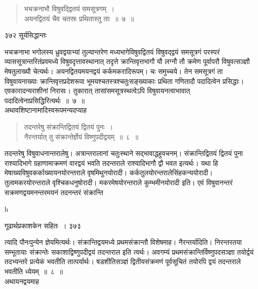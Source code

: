 \documentclass[11pt, openany]{book}
\begin{document}
 \begin{quote}
{\ssi भचक्रनाभौ विषुवद्द्वितयं समसूत्रगम्~।\\
अयनद्वितयं चैव चतस्रः प्रथितास्तु ताः~॥~७~॥}
\end{quote}


\newpage


\noindent ३७२ \hspace{4cm} सूर्यसिद्धान्तः
\vspace{1cm}


 भचक्रनाभा भगोलस्य ध्रुवद्वयाभ्यां तुल्यान्तरेण मध्यभागेविषुवद्वितयं विषुवद्द्वयं समसूत्रगं परस्परं व्याससूत्रान्तरितंप्रवमध्ये विषुवदृत्तावस्थानात् तदृत्ते क्रान्तिवृत्तभागौ यौ लग्नौ तौ क्रमेण पूर्वापरौ विषुवत्सञ्ज्ञौ मेषतुलाख्यौ चेत्यर्थः। अयनद्वितयमयनद्वयं कर्कमकरादिरूपम्। चः समुच्चये। तेन समसूत्रगं ता विषुवायनाख्याः क्रान्तिवृत्तप्रदेशरूपा भूमयश्चतस्त्रश्चतुःसङ्ख्याकाः प्रथिता गणितादौ पदादित्वेन प्रसिद्धाः। एवकारादन्यराशीनां निरासः। तुकारात् तासांसमसूत्रस्थत्वेऽपि विषुवायनत्वाभावात् पदादित्वेनाप्रसिद्धिरित्यर्थः~॥~७~॥\\ 
\noindent अथावशिष्टानामादिस्वरूपमन्यदप्याह\textendash


\begin{quote}
{\ssi तदन्तरेषु संक्रान्तिद्वितयं द्वितयं पुनः~।\\
नैरन्तर्यात् तु संक्रान्तेर्ज्ञेयं विष्णुपदीद्वयम्~॥~८~॥ }
\end{quote}
 तदन्तरेषु विषुवाधनान्तरालेषु। अत्रान्तरालानां चतुःस्थाने सद्भावाद्धहुवचनम्। संक्रान्तिद्वितयं द्वितयं पुना राश्यादिभागे ग्रहाणामाक्रमणं वारद्वयं भवति तदन्तराले राश्यादिभागौ द्वौ भवत इत्यर्थः। यथा हि मेषाख्यविषुवकर्काख्यायनयोरन्तराले वृषमिथुनयोरादी। कर्कतुलयोरन्तरालेसिंहकन्ययोरादी। तुलामकरयोरन्तराले वृश्चिकधनुषोरादी। मकरमेषयोरन्तराले कुम्भमीनयोरादी इति। एवं विषुवानन्तरं सक्रमणद्वयमनन्तरमयनं तदनन्तरं संक्रान्ति \textendash


{\tiny{h}}

\newpage


\hspace{3cm} गूढार्थप्रकाशकेन सहितः~। \hfill ३७३
\vspace{1cm}


\noindent त्यादि पौनःपुन्येन ज्ञेयमित्यर्थः। संक्रान्तिद्वयमध्ये प्रथमसंक्रान्तौ विशेषमाह। नैरन्तर्यादिति। निरन्तरतया सम्भूतायाः संक्रान्तेः सकाशाद्विष्णुपदीद्वयं तदन्तराल इति त्वर्थः। अवगम्यं प्रथमसंक्रान्तिर्विष्णुपदसञ्ज्ञा तयोर्द्वयं तदभ्यन्तरे प्रत्येकं भवतीति तात्पर्यार्थः। षडशीतिसञ्ज्ञं द्वितीयसंक्रमणं पूर्वसूचितं तयोरपि द्वयं तदन्तराले भवतीति ध्येयम्~॥~८~॥\\
\noindent अथायनद्वयमाह \textendash
\end{document}

